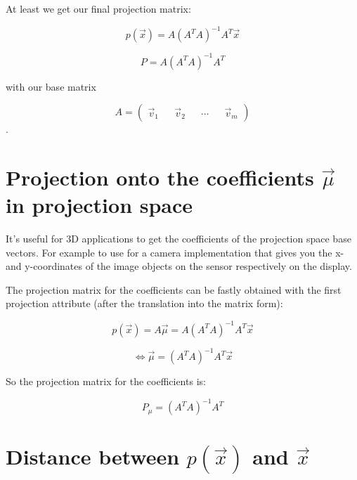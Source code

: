 \documentclass{article}
\begin{document}
At least we get our final projection matrix:

	\begin{equation}
		p(\vec{x}) = A(A^T A)^{-1} A^T \vec{x}
	\end{equation}

	\begin{equation}
		P = A(A^T A)^{-1} A^T
	\end{equation}

with our base matrix

	\begin{equation}
		A = \begin{pmatrix} \vec{v}_1 && \vec{v}_2 && \cdots && \vec{v}_m \end{pmatrix}
	\end{equation}.






\section{Projection onto the coefficients \(\vec{\mu}\) in projection space}

It's useful for 3D applications to get the coefficients of the projection space base vectors. For
example to use for a camera implementation that gives you the x- and y-coordinates of the image
objects on the sensor respectively on the display.

The projection matrix for the coefficients can be fastly obtained with the first projection
attribute (after the translation into the matrix form):

	\begin{equation}
		p(\vec{x}) = A \vec{\mu} = A(A^T A)^{-1} A^T \vec{x}
	\end{equation}

	\begin{equation}
		\iff \vec{\mu} = (A^T A)^{-1} A^T \vec{x}
	\end{equation}

So the projection matrix for the coefficients is:

	\begin{equation}
		P_{\mu} = (A^T A)^{-1} A^T
	\end{equation}






\section{Distance between \(p(\vec{x})\) and \(\vec{x}\)}
\end{document}
